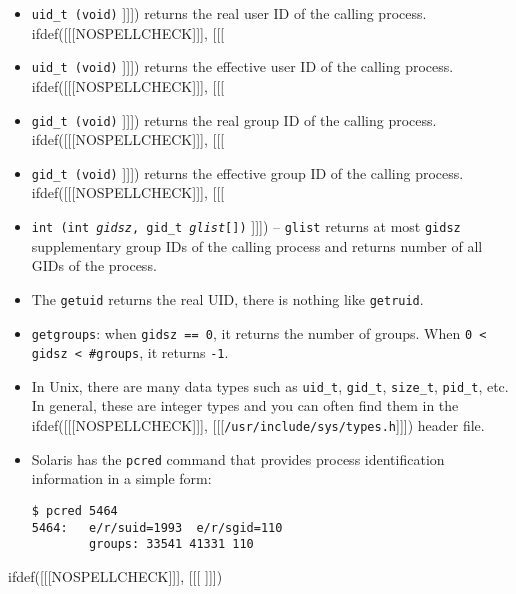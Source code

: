 \begin{slide}
\begin{itemize}
ifdef([[[NOSPELLCHECK]]], [[[
\item \texttt{uid\_t (void)}
]]])
returns the real user ID of the calling process.
ifdef([[[NOSPELLCHECK]]], [[[
\item \texttt{uid\_t (void)}
]]])
returns the effective user ID of the calling process.
ifdef([[[NOSPELLCHECK]]], [[[
\item \texttt{gid\_t (void)}
]]])
returns the real group ID of the calling process.
ifdef([[[NOSPELLCHECK]]], [[[
\item \texttt{gid\_t (void)}
]]])
returns the effective group ID of the calling process.
ifdef([[[NOSPELLCHECK]]], [[[
\item \texttt{int (int \emph{gidsz}, gid\_t \emph{glist}[])}
]]])
-- \texttt{glist} returns at most \texttt{gidsz} supplementary group
IDs of the calling process and returns number of all GIDs of the process.
\end{itemize}
\end{slide}

\begin{itemize}
\item The \texttt{getuid} returns the real UID, there is nothing like
\texttt{getruid}.
\item \texttt{getgroups}: when \texttt{gidsz~==~0}, it returns the number of
groups. When \texttt{0 < gidsz < \#groups}, it returns \texttt{-1}.
\item In Unix, there are many data types such as \verb#uid_t#, \verb#gid_t#,
\verb#size_t#, \verb#pid_t#, etc.  In general, these are integer types and you
can often find them in the
ifdef([[[NOSPELLCHECK]]], [[[\texttt{/usr/inc{}lude/sys/types.h}]]]) header
file.
\item Solaris has the \texttt{pcred} command that provides process
identification information in a simple form:

\begin{verbatim}
$ pcred 5464
5464:   e/r/suid=1993  e/r/sgid=110
        groups: 33541 41331 110
\end{verbatim}
\end{itemize}


ifdef([[[NOSPELLCHECK]]], [[[
]]])

